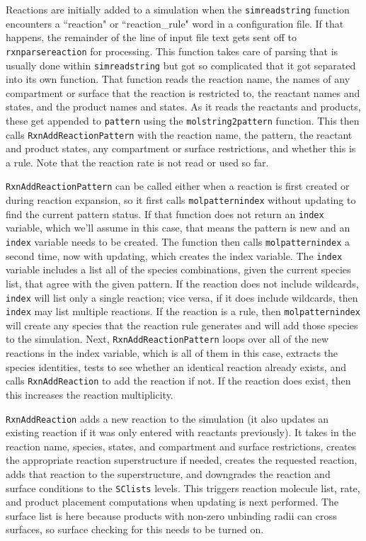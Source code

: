 \documentclass {book}
\newcommand {\ttt} {\texttt}
\begin{document}
Reactions are initially added to a simulation when the \ttt{simreadstring} function encounters a ``reaction" or ``reaction\_rule" word in a configuration file. If that happens, the remainder of the line of input file text gets sent off to \ttt{rxnparsereaction} for processing. This function takes care of parsing that is usually done within \ttt{simreadstring} but got so complicated that it got separated into its own function. That function reads the reaction name, the names of any compartment or surface that the reaction is restricted to, the reactant names and states, and the product names and states. As it reads the reactants and products, these get appended to \ttt{pattern} using the \ttt{molstring2pattern} function. This then calls \ttt{RxnAddReactionPattern} with the reaction name, the pattern, the reactant and product states, any compartment or surface restrictions, and whether this is a rule. Note that the reaction rate is not read or used so far.

\ttt{RxnAddReactionPattern} can be called either when a reaction is first created or during reaction expansion, so it first calls \ttt{molpatternindex} without updating to find the current pattern status. If that function does not return an \ttt{index} variable, which we'll assume in this case, that means the pattern is new and an \ttt{index} variable needs to be created. The function then calls \ttt{molpatternindex} a second time, now with updating, which creates the index variable. The \ttt{index} variable includes a list all of the species combinations, given the current species list, that agree with the given pattern. If the reaction does not include wildcards, \ttt{index} will list only a single reaction; vice versa, if it does include wildcards, then \ttt{index} may list multiple reactions. If the reaction is a rule, then \ttt{molpatternindex} will create any species that the reaction rule generates and will add those species to the simulation. Next, \ttt{RxnAddReactionPattern} loops over all of the new reactions in the index variable, which is all of them in this case, extracts the species identities, tests to see whether an identical reaction already exists, and calls \ttt{RxnAddReaction} to add the reaction if not. If the reaction does exist, then this increases the reaction multiplicity.

\ttt{RxnAddReaction} adds a new reaction to the simulation (it also updates an existing reaction if it was only entered with reactants previously). It takes in the reaction name, species, states, and compartment and surface restrictions, creates the appropriate reaction superstructure if needed, creates the requested reaction, adds that reaction to the superstructure, and downgrades the reaction and surface conditions to the \ttt{SClists} levels. This triggers reaction molecule list, rate, and product placement computations when updating is next performed. The surface list is here because products with non-zero unbinding radii can cross surfaces, so surface checking for this needs to be turned on.
\end{document}
